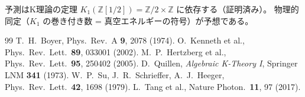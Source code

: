 \documentclass[11pt,a4paper]{article}
\begin{document}
予測はK理論の定理 $K_1(\mathbb{Z}[1/2]) = \mathbb{Z}/2 \times \mathbb{Z}$ に依存する（証明済み）。
物理的同定（$K_1$ の巻き付き数 = 真空エネルギーの符号）が予想である。

\begin{thebibliography}{99}
 T.~H.~Boyer, Phys.\ Rev.\ A \textbf{9}, 2078 (1974).
 O.~Kenneth et al., Phys.\ Rev.\ Lett.\ \textbf{89}, 033001 (2002).
 M.~P.~Hertzberg et al., Phys.\ Rev.\ Lett.\ \textbf{95}, 250402 (2005).
 D.~Quillen, \textit{Algebraic K-Theory I}, Springer LNM \textbf{341} (1973).
 W.~P.~Su, J.~R.~Schrieffer, A.~J.~Heeger, Phys.\ Rev.\ Lett.\ \textbf{42}, 1698 (1979).
 L.~Tang et al., Nature Photon.\ \textbf{11}, 97 (2017).
\end{thebibliography}
\end{document}
